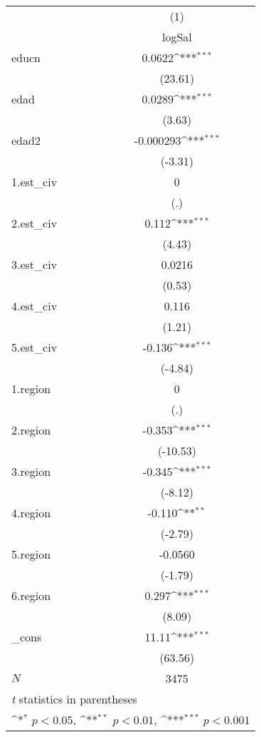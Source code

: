 {
\def\sym#1{\ifmmode^{#1}\else\(^{#1}\)\fi}
\begin{tabular}{l*{1}{c}}
\hline\hline
            &\multicolumn{1}{c}{(1)}\\
            &\multicolumn{1}{c}{logSal}\\
\hline
educn       &      0.0622\sym{***}\\
            &     (23.61)         \\
[1em]
edad        &      0.0289\sym{***}\\
            &      (3.63)         \\
[1em]
edad2       &   -0.000293\sym{***}\\
            &     (-3.31)         \\
[1em]
1.est\_civ   &           0         \\
            &         (.)         \\
[1em]
2.est\_civ   &       0.112\sym{***}\\
            &      (4.43)         \\
[1em]
3.est\_civ   &      0.0216         \\
            &      (0.53)         \\
[1em]
4.est\_civ   &       0.116         \\
            &      (1.21)         \\
[1em]
5.est\_civ   &      -0.136\sym{***}\\
            &     (-4.84)         \\
[1em]
1.region    &           0         \\
            &         (.)         \\
[1em]
2.region    &      -0.353\sym{***}\\
            &    (-10.53)         \\
[1em]
3.region    &      -0.345\sym{***}\\
            &     (-8.12)         \\
[1em]
4.region    &      -0.110\sym{**} \\
            &     (-2.79)         \\
[1em]
5.region    &     -0.0560         \\
            &     (-1.79)         \\
[1em]
6.region    &       0.297\sym{***}\\
            &      (8.09)         \\
[1em]
\_cons      &       11.11\sym{***}\\
            &     (63.56)         \\
\hline
\(N\)       &        3475         \\
\hline\hline
\multicolumn{2}{l}{\footnotesize \textit{t} statistics in parentheses}\\
\multicolumn{2}{l}{\footnotesize \sym{*} \(p<0.05\), \sym{**} \(p<0.01\), \sym{***} \(p<0.001\)}\\
\end{tabular}
}

